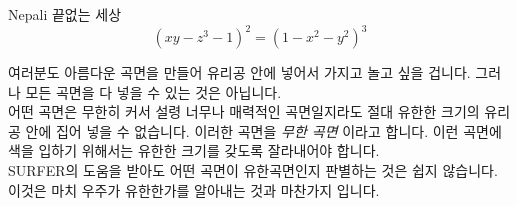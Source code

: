 \begin{surferPage}{Nepali}
끝없는 세상 \\
\smallskip
\[(x y - z^3 -1)^2= (1 - x^2	- y^2)^3\]

\singlespacing
여러분도 아름다운 곡면을 만들어 유리공 안에 넣어서 가지고 놀고 싶을 겁니다. 그러나 모든 곡면을 다 넣을 수 있는  것은 아닙니다.
\\
\singlespacing
어떤 곡면은 무한히 커서 설령 너무나 매력적인 곡면일지라도 절대 유한한 크기의 유리공 안에 집어 넣을 수 없습니다. 이러한 곡면을 \textit{무한 곡면} 이라고 합니다. 이런 곡면에 색을 입하기 위해서는 유한한 크기를 갖도록 잘라내어야 합니다. 
\\
\singlespacing
SURFER의 도움을 받아도 어떤 곡면이 유한곡면인지 판별하는 것은 쉽지 않습니다. 이것은 마치 우주가 유한한가를 알아내는 것과 마찬가지 입니다.
\end{surferPage}
